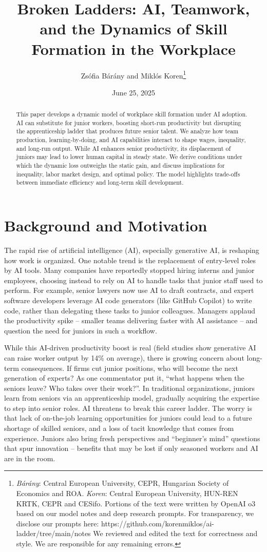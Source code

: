 \documentclass[12pt]{article}
\title{Broken Ladders: AI, Teamwork, and the Dynamics of Skill Formation in the Workplace}
\author{Zsófia Bárány and Miklós Koren\thanks{\emph{Bárány}: Central European University, CEPR, Hungarian Society of Economics and ROA. \emph{Koren}: Central European University, HUN-REN KRTK, CEPR and CESifo.  Portions of the text were written by OpenAI o3 based on our model notes and deep research prompts. For transparency, we disclose our prompts here: https://github.com/korenmiklos/ai-ladder/tree/main/notes We reviewed and edited the text for correctness and style. We are responsible for any remaining errors.}}
\date{June 25, 2025}
\begin{document}
\maketitle
\begin{abstract}
This paper develops a dynamic model of workplace skill formation under AI adoption. AI can substitute for junior workers, boosting short-run productivity but disrupting the apprenticeship ladder that produces future senior talent. We analyze how team production, learning-by-doing, and AI capabilities interact to shape wages, inequality, and long-run output. While AI enhances senior productivity, its displacement of juniors may lead to lower human capital in steady state. We derive conditions under which the dynamic loss outweighs the static gain, and discuss implications for inequality, labor market design, and optimal policy. The model highlights trade-offs between immediate efficiency and long-term skill development.
\end{abstract}
\section{Background and Motivation}\label{background-and-motivation}

The rapid rise of artificial intelligence (AI), especially generative AI, is reshaping how work is organized. One notable trend is the {replacement of entry-level roles by AI tools}. Many companies have reportedly stopped hiring interns and junior employees, choosing instead to rely on AI to handle tasks that junior staff used to perform. For example, {senior lawyers now use AI to draft contracts}, and {expert software developers leverage AI code generators (like GitHub Copilot) to write code}, rather than delegating these tasks to junior colleagues. Managers applaud the productivity spike -- {smaller teams delivering faster with AI assistance} -- and question the need for juniors in such a workflow. 

While this {AI-driven productivity boost} is real (field studies show generative AI can raise worker output by 14\% on average), there is
growing concern about {long-term consequences}. If firms cut junior positions, {who will become the next generation of experts?}
As one commentator put it, {``what happens when the seniors leave?
Who takes over their work?''}. In traditional organizations, juniors
learn from seniors via an {apprenticeship model}, gradually
acquiring the expertise to step into senior roles. AI threatens to break
this {career ladder}. The worry is that {lack of
on-the-job learning opportunities} for juniors could lead to a future
shortage of skilled seniors, and a loss of tacit knowledge that comes
from experience. Juniors also bring fresh perspectives and ``beginner's
mind'' questions that spur innovation -- benefits that may be lost if
only seasoned workers and AI are in the room.
\end{document}
